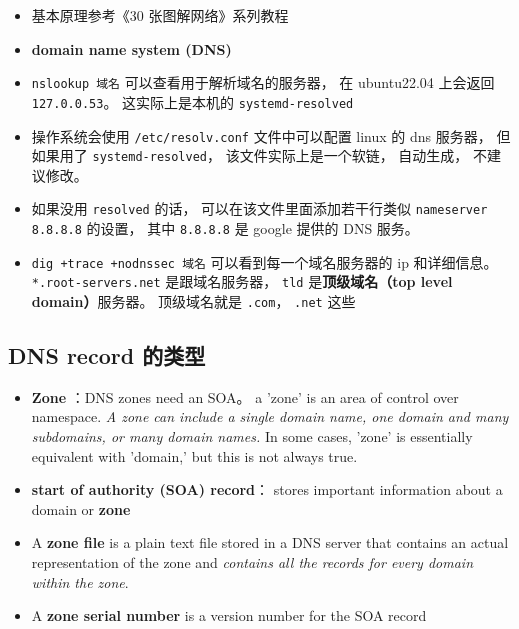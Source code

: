 
\begin{itemize}
\item 基本原理参考《30 张图解网络》系列教程
\item \textbf{domain name system (DNS)}
\item \verb|nslookup 域名| 可以查看用于解析域名的服务器， 在 ubuntu22.04 上会返回 \verb|127.0.0.53|。 这实际上是本机的 \verb|systemd-resolved|
\item 操作系统会使用 \verb|/etc/resolv.conf| 文件中可以配置 linux 的 dns 服务器， 但如果用了 \verb|systemd-resolved|， 该文件实际上是一个软链， 自动生成， 不建议修改。
\item 如果没用 \verb|resolved| 的话， 可以在该文件里面添加若干行类似 \verb|nameserver 8.8.8.8| 的设置， 其中 \verb|8.8.8.8| 是 google 提供的 DNS 服务。
\item \verb|dig +trace +nodnssec 域名| 可以看到每一个域名服务器的 ip 和详细信息。 \verb|*.root-servers.net| 是跟域名服务器， \verb|tld| 是\textbf{顶级域名（top level domain）}服务器。 顶级域名就是 \verb|.com|， \verb|.net| 这些
\end{itemize}

\subsection{DNS record 的类型}
\begin{itemize}
\item \textbf{Zone} ：DNS zones need an SOA。 a 'zone' is an area of control over namespace. \textsl{A zone can include a single domain name, one domain and many subdomains, or many domain names.} In some cases, 'zone' is essentially equivalent with 'domain,' but this is not always true.
\item \textbf{start of authority (SOA) record}： stores important information about a domain or \textbf{zone}
\item A \textbf{zone file} is a plain text file stored in a DNS server that contains an actual representation of the zone and \textsl{contains all the records for every domain within the zone}.
\item A \textbf{zone serial number} is a version number for the SOA record
\end{itemize}
